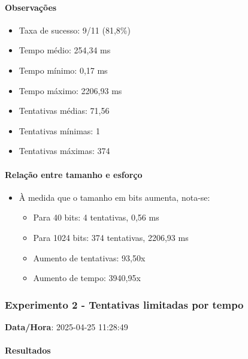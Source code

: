 \paragraph{Observações}
\begin{itemize}
    \item Taxa de sucesso: 9/11 (81,8\%)
    \item Tempo médio: 254,34 ms
    \item Tempo mínimo: 0,17 ms
    \item Tempo máximo: 2206,93 ms
    \item Tentativas médias: 71,56
    \item Tentativas mínimas: 1
    \item Tentativas máximas: 374
\end{itemize}

\paragraph{Relação entre tamanho e esforço}
\begin{itemize}
    \item À medida que o tamanho em bits aumenta, nota-se:
    \begin{itemize}
        \item Para 40 bits: 4 tentativas, 0,56 ms
        \item Para 1024 bits: 374 tentativas, 2206,93 ms
        \item Aumento de tentativas: 93,50x
        \item Aumento de tempo: 3940,95x
    \end{itemize}
\end{itemize}

\subsubsection{Experimento 2 - Tentativas limitadas por tempo}

\textbf{Data/Hora}: 2025-04-25 11:28:49

\paragraph{Resultados}

